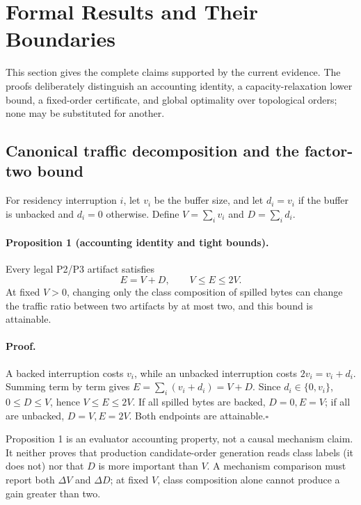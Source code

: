 \section{Formal Results and Their Boundaries}\label{sec:supp-formal}

This section gives the complete claims supported by the current evidence. The proofs deliberately distinguish an accounting identity, a capacity-relaxation lower bound, a fixed-order certificate, and global optimality over topological orders; none may be substituted for another.

\subsection{Canonical traffic decomposition and the factor-two bound}

For residency interruption $i$, let $v_i$ be the buffer size, and let $d_i=v_i$ if the buffer is unbacked and $d_i=0$ otherwise. Define $V=\sum_i v_i$ and $D=\sum_i d_i$.

\paragraph{Proposition 1 (accounting identity and tight bounds).}
Every legal P2/P3 artifact satisfies
\begin{equation}\label{eq:supp-identity-proof}
 E=V+D,\qquad V\le E\le 2V.
\end{equation}
At fixed $V>0$, changing only the class composition of spilled bytes can change the traffic ratio between two artifacts by at most two, and this bound is attainable.

\paragraph{Proof.}
A backed interruption costs $v_i$, while an unbacked interruption costs $2v_i=v_i+d_i$. Summing term by term gives $E=\sum_i(v_i+d_i)=V+D$. Since $d_i\in\{0,v_i\}$, $0\le D\le V$, hence $V\le E\le2V$. If all spilled bytes are backed, $D=0,E=V$; if all are unbacked, $D=V,E=2V$. Both endpoints are attainable.\hfill$\square$

Proposition 1 is an evaluator accounting property, not a causal mechanism claim. It neither proves that production candidate-order generation reads class labels (it does not) nor that $D$ is more important than $V$. A mechanism comparison must report both $\Delta V$ and $\Delta D$; at fixed $V$, class composition alone cannot produce a gain greater than two.


